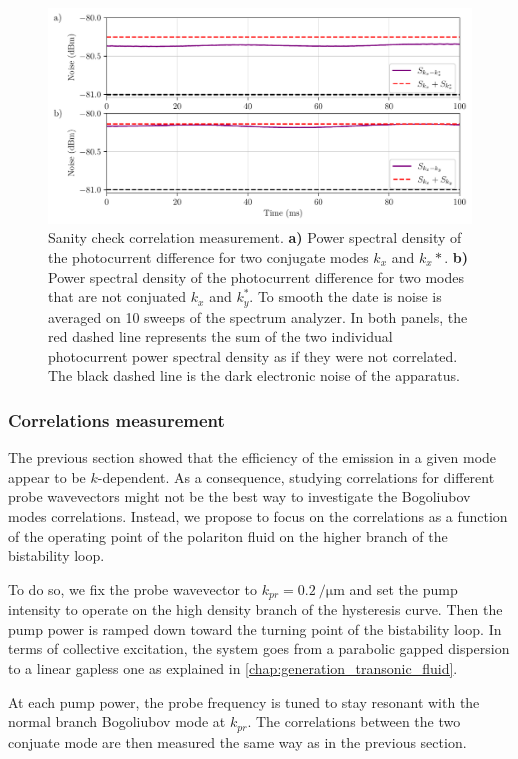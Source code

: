 \begin{figure}
    \centering
    \includegraphics[width=1\textwidth]{chap_correlation/fig/noise_comparison.pdf}
    \caption{Sanity check correlation measurement. \textbf{a)} Power spectral density of the photocurrent difference for two conjugate modes $k_x$ and $k_x*$. \textbf{b)} Power spectral density of the photocurrent difference for two modes that are not conjuated $k_x$ and $k_y^*$. To smooth 
    the date is noise is averaged on 10 sweeps of the spectrum analyzer. In both panels, the red dashed line represents the sum of the two individual photocurrent power spectral density as if they were not correlated. The black dashed line is the dark electronic noise of the apparatus.} 
    \label{fig:noise_comparison}
\end{figure}



\subsubsection{Correlations measurement}
\label{sec:exp_corr_measurement}

The previous section showed that the efficiency of the emission in a given mode appear to be $k$-dependent. As a consequence, studying correlations for different probe wavevectors might not be the best way to investigate the Bogoliubov modes correlations.
Instead, we propose to focus on the correlations as a function of the operating point of the polariton fluid on the higher branch of the bistability loop. 

To do so, we fix the probe wavevector to $k_{pr}=\SI{0.2}{\per\micro\meter}$ and set the pump intensity to operate on the high density branch of the hysteresis curve. Then the pump power is ramped down toward the turning point of the bistability loop.
In terms of collective excitation, the system goes from a parabolic gapped dispersion to a linear gapless one as explained in \autoref{chap:generation_transonic_fluid}.

At each pump power, the probe frequency is tuned to stay resonant with the normal branch Bogoliubov mode at $k_{pr}$. The correlations between the two conjuate mode are then measured the same way as in the previous section. 

